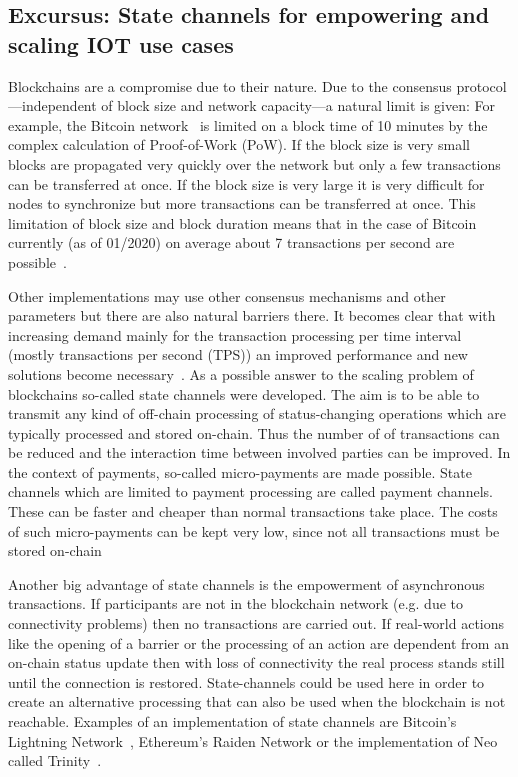 \documentclass[conference]{IEEEtran}
\begin{document}
%
\subsection{Excursus: State channels for empowering and scaling IOT use cases}

Blockchains are a compromise due to their nature. Due to the consensus protocol---independent of block size and network capacity---a natural limit is given: For example, the Bitcoin network~\cite{nakamoto2009} is limited on a block time of 10 minutes by the complex calculation of Proof-of-Work (PoW). If the block size is very small blocks are propagated very quickly over the network but only a few transactions can be transferred at once. If the block size is very large it is very difficult for nodes to synchronize but more transactions can be transferred at once. This limitation of block size and block duration means that in the case of Bitcoin currently (as of 01/2020) on average about 7 transactions per second are possible~\cite{Macdonald2017}.

Other implementations may use other consensus mechanisms and other parameters but there are also natural barriers there. It becomes clear that with increasing demand mainly for the transaction processing per time interval (mostly transactions per second (TPS)) an improved performance and new solutions become necessary~\cite{Macdonald2017}. As a possible answer to the scaling problem of blockchains so-called state channels were developed. The aim is to be able to transmit any kind of off-chain processing of status-changing operations which are typically processed and stored on-chain. Thus the number of of transactions can be reduced and the interaction time between involved parties can be improved. In the context of payments, so-called micro-payments are made possible. State channels which are limited to payment processing are called payment channels. These can be faster and cheaper than normal transactions take place. The costs of such micro-payments can be kept very low, since not all transactions must be stored on-chain~\cite{Coleman2018}

Another big advantage of state channels is the empowerment of asynchronous transactions. If participants are not in the blockchain network (e.g. due to connectivity problems) then no transactions are carried out. If real-world actions like the opening of a barrier or the processing of an action are dependent from an on-chain status update then with loss of connectivity the real process stands still until the connection is restored. State-channels could be used here in order to create an alternative processing that can also be used when the blockchain is not reachable. Examples of an implementation of state channels are Bitcoin's Lightning Network~\cite{Lightning2016}, Ethereum's Raiden Network or the implementation of Neo called Trinity~\cite{Trinity2018}.
\end{document}
